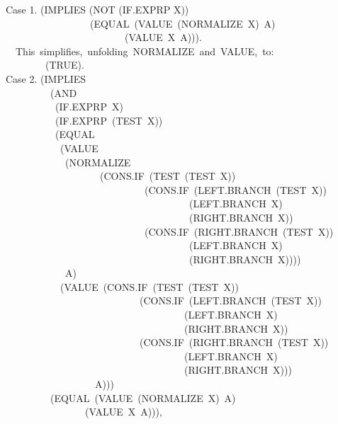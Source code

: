 \documentclass[10pt]{book}
\newenvironment{pubasis}{\begin{flushleft}}{\end{flushleft}}
\begin{document}
\begin{pubasis}
Case 1.	(IMPLIES (NOT (IF.EXPRP X))\\
~~~~~~~~~~~~~~~~~(EQUAL~(VALUE~(NORMALIZE~X)~A)\\
~~~~~~~~~~~~~~~~~~~~~~~~(VALUE~X~A))).\\

~~This~simplifies,~unfolding~NORMALIZE~and~VALUE,~to:\\

~~~~~~~~(TRUE).\\

Case 2.	(IMPLIES\\
~~~~~~~~~(AND\\
~~~~~~~~~~(IF.EXPRP~X)\\
~~~~~~~~~~(IF.EXPRP~(TEST~X))\\
~~~~~~~~~~(EQUAL\\
~~~~~~~~~~~(VALUE\\
~~~~~~~~~~~~(NORMALIZE\\
~~~~~~~~~~~~~~~~~~~(CONS.IF~(TEST~(TEST~X))\\
~~~~~~~~~~~~~~~~~~~~~~~~~~~~(CONS.IF~(LEFT.BRANCH~(TEST~X))\\
~~~~~~~~~~~~~~~~~~~~~~~~~~~~~~~~~~~~~(LEFT.BRANCH~X)\\
~~~~~~~~~~~~~~~~~~~~~~~~~~~~~~~~~~~~~(RIGHT.BRANCH~X))\\
~~~~~~~~~~~~~~~~~~~~~~~~~~~~(CONS.IF~(RIGHT.BRANCH~(TEST~X))\\
~~~~~~~~~~~~~~~~~~~~~~~~~~~~~~~~~~~~~(LEFT.BRANCH~X)\\
~~~~~~~~~~~~~~~~~~~~~~~~~~~~~~~~~~~~~(RIGHT.BRANCH~X))))\\
~~~~~~~~~~~~A)\\
~~~~~~~~~~~(VALUE~(CONS.IF~(TEST~(TEST~X))\\
~~~~~~~~~~~~~~~~~~~~~~~~~~~(CONS.IF~(LEFT.BRANCH~(TEST~X))\\
~~~~~~~~~~~~~~~~~~~~~~~~~~~~~~~~~~~~(LEFT.BRANCH~X)\\
~~~~~~~~~~~~~~~~~~~~~~~~~~~~~~~~~~~~(RIGHT.BRANCH~X))\\
~~~~~~~~~~~~~~~~~~~~~~~~~~~(CONS.IF~(RIGHT.BRANCH~(TEST~X))\\
~~~~~~~~~~~~~~~~~~~~~~~~~~~~~~~~~~~~(LEFT.BRANCH~X)\\
~~~~~~~~~~~~~~~~~~~~~~~~~~~~~~~~~~~~(RIGHT.BRANCH~X)))\\
~~~~~~~~~~~~~~~~~~A)))\\
~~~~~~~~~(EQUAL~(VALUE~(NORMALIZE~X)~A)\\
~~~~~~~~~~~~~~~~(VALUE~X~A))),\\


\end{pubasis}
\end{document}
